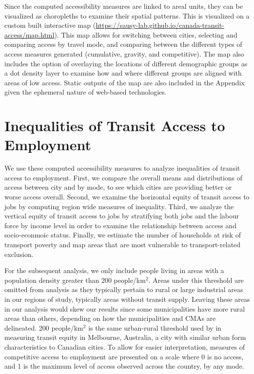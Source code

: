 \documentclass[11 pt, letterpaper]{article}
\begin{document}
{Since the computed accessibility measures are linked to areal units, they can be visualized as choropleths to examine their spatial patterns. This is visualized on a custom built interactive map (\url{https://sausy-lab.github.io/canada-transit-access/map.html}). This map allows for switching between cities, selecting and comparing access by travel mode, and comparing between the different types of access measures generated (cumulative, gravity, and competitive). The map also includes the option of overlaying the locations of different demographic groups as a dot density layer to examine how and where different groups are aligned with areas of low access. Static outputs of the map are also included in the Appendix given the ephemeral nature of web-based technologies. 




\newpage

\section{Inequalities of Transit Access to Employment}

We use these computed accessibility measures to analyze inequalities of transit access to employment. First, we compare the overall means and distributions of access between city and by mode, to see which cities are providing better or worse access overall. Second, we examine the horizontal equity of transit access to jobs by computing region wide measures of inequality. Third, we analyze the vertical equity of transit access to jobs by stratifying both jobs and the labour force by income level in order to examine the relationship between access and socio-econmoic status. Finally, we estimate the number of households at risk of transport poverty and map areas that are most vulnerable to transport-related exclusion.

For the subsequent analysis, we only include people living in areas with a population density greater than 200 people/km$^{2}$. Areas under this threshold are omitted from analysis as they typically pertain to rural or large industrial areas in our regions of study, typically areas without transit supply. Leaving these areas in our analysis would skew our results since some municipalities have more rural areas than others, depending on how the municipalities and CMAs are delineated. 200 people/km$^{2}$ is the same urban-rural threshold used by  in measuring transit equity in Melbourne, Australia, a city with similar urban form characteristics to Canadian cities. To allow for easier interpretation, measures of competitive access to employment are presented on a scale where 0 is no access, and 1 is the maximum level of access observed across the country, by any mode. 


}
\end{document}

